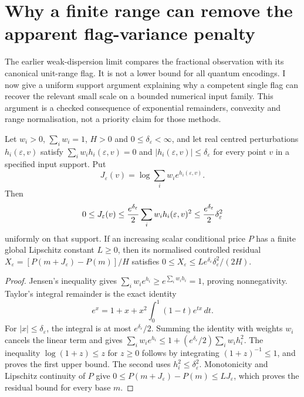 \section{Why a finite range can remove the apparent flag-variance penalty}
\label{sec:weak-dispersion-range}

The earlier weak-dispersion limit compares the fractional observation with
its canonical unit-range flag. It is not a lower bound for all quantum
encodings. I now give a uniform support argument explaining why a competent
single flag can recover the relevant small scale on a bounded numerical
input family. This argument is a checked consequence of exponential
remainders, convexity and range normalisation, not a priority claim for those
methods.

\begin{proposition}
Let $w_i>0$, $\sum_iw_i=1$, $H>0$ and $0\leq\delta_\varepsilon<\infty$, and let real centred perturbations
$h_i(\varepsilon,v)$ satisfy
$\sum_iw_i h_i(\varepsilon,v)=0$ and
$|h_i(\varepsilon,v)|\leq\delta_\varepsilon$ for every point $v$ in a
specified input support. Put
\[
 J_\varepsilon(v)=\log\sum_iw_i e^{h_i(\varepsilon,v)}.
\]
Then
\[
 0\leq J_\varepsilon(v)\leq
 {e^{\delta_\varepsilon}\over2}
       \sum_iw_i h_i(\varepsilon,v)^2
 \leq{e^{\delta_\varepsilon}\over2}\delta_\varepsilon^2
\]
uniformly on that support. If an increasing scalar conditional price $P$
has a finite global Lipschitz constant $L\geq0$, then its normalised controlled residual
$X_\varepsilon=[P(m+J_\varepsilon)-P(m)]/H$ satisfies
$0\leq X_\varepsilon\leq Le^{\delta_\varepsilon}\delta_\varepsilon^2/(2H)$.
\end{proposition}
\begin{proof}
Jensen's inequality gives $\sum_iw_i e^{h_i}\geq
 e^{\sum_iw_i h_i}=1$, proving nonnegativity. Taylor's integral remainder
is the exact identity
\[
 e^x=1+x+x^2\int_0^1(1-t)e^{tx}\,dt.
\]
For $|x|\leq\delta_\varepsilon$, the integral is at most
$e^{\delta_\varepsilon}/2$. Summing the identity with weights $w_i$
cancels the linear term and gives
$\sum_iw_i e^{h_i}\leq1+(e^{\delta_\varepsilon}/2)\sum_iw_i h_i^2$.
The inequality $\log(1+z)\leq z$ for $z\geq0$ follows by integrating
$(1+z)^{-1}\leq1$, and proves the first upper bound. The second uses
$h_i^2\leq\delta_\varepsilon^2$. Monotonicity and Lipschitz continuity of
$P$ give $0\leq P(m+J_\varepsilon)-P(m)\leq LJ_\varepsilon$,
which proves the residual bound for every base $m$.
\end{proof}


